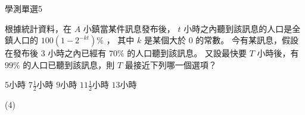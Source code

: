     \begin{QUESTION}
        \begin{ExamInfo}{92}{學測}{單選}{5}
        \end{ExamInfo}
        \begin{ExamAnsRateInfo}{22}{43}{15}{8}
        \end{ExamAnsRateInfo}
        \begin{QBODY}
            根據統計資料，在  $A$ 小鎮當某件訊息發布後， 
            $t$ 小時之內聽到該訊息的人口是全鎮人口的 $100(1- 2^{-kt})\%$ ，
            其中 $k$ 是某個大於 $0$ 的常數。
            今有某訊息，假設在發布後 $3$ 小時之內已經有 $70\%$ 的人口聽到該訊息。
            又設最快要 $T$ 小時後，有 $99\%$ 的人口已聽到該訊息，則 $T$ 最接近下列哪一個選項？
            \begin{QOPS} 
                \QOP $5$小時        
                \QOP $7\frac{1}{2}$小時
                \QOP $9$小時 
                \QOP $11\frac{1}{2}$小時 
                \QOP $13$小時
            \end{QOPS}
        \end{QBODY}
        \begin{QFROMS}
        \end{QFROMS}
        \begin{QTAGS}\end{QTAGS}
        \begin{QANS}
            (4)
        \end{QANS}
        \begin{QSOLLIST}
        \end{QSOLLIST}
        \begin{QEMPTYSPACE}
        \end{QEMPTYSPACE}
    \end{QUESTION}
